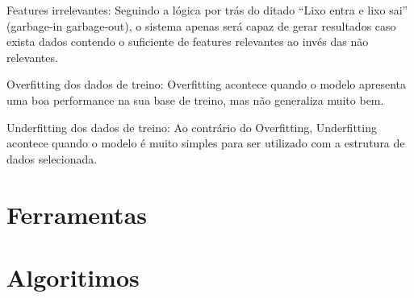 Features  irrelevantes: Seguindo a lógica por trás do ditado “Lixo entra e lixo sai” (garbage-in garbage-out), o sistema apenas será capaz de gerar resultados caso exista dados contendo o suficiente de features relevantes ao invés das não relevantes.

Overfitting dos dados de treino: Overfitting acontece quando o modelo apresenta uma boa performance na sua base de treino, mas não generaliza muito bem.

Underfitting dos dados de treino: Ao contrário do Overfitting, Underfitting acontece quando o modelo é muito simples para ser utilizado com a estrutura de dados selecionada.

\section{Ferramentas}
\section{Algoritimos}




